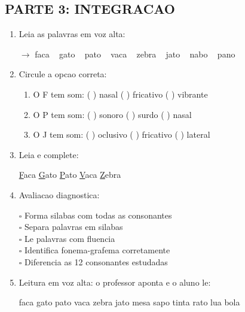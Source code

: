 \begin{exercicio}
\subsection*{PARTE 3: INTEGRACAO}

\begin{enumerate}[resume]
  \item Leia as palavras em voz alta:
  \begin{center}
  $\rightarrow$ faca  ~  gato  ~  pato  ~  vaca  ~  zebra  ~  jato  ~  nabo  ~  pano
  \end{center}

  \item Circule a opcao correta:
  \begin{enumerate}[label=(\alph*)]
    \item O F tem som: ( ) nasal ( ) fricativo ( ) vibrante
    \item O P tem som: ( ) sonoro ( ) surdo ( ) nasal
    \item O J tem som: ( ) oclusivo ( ) fricativo ( ) lateral
  \end{enumerate}

  \item Leia e complete:
  \begin{center}
  \underline{F}aca \quad \underline{G}ato \quad \underline{P}ato \quad \underline{V}aca \quad \underline{Z}ebra
  \end{center}

  \item Avaliacao diagnostica:
  \begin{center}
  $\square$ Forma silabas com todas as consonantes\\
  $\square$ Separa palavras em silabas\\
  $\square$ Le palavras com fluencia\\
  $\square$ Identifica fonema-grafema corretamente\\
  $\square$ Diferencia as 12 consonantes estudadas
  \end{center}

  \item Leitura em voz alta: o professor aponta e o aluno le:
  \begin{center}
  faca \quad gato \quad pato \quad vaca \quad zebra \quad jato \quad mesa \quad sapo \quad tinta \quad rato \quad lua \quad bola
  \end{center}
\end{enumerate}
\end{exercicio}

